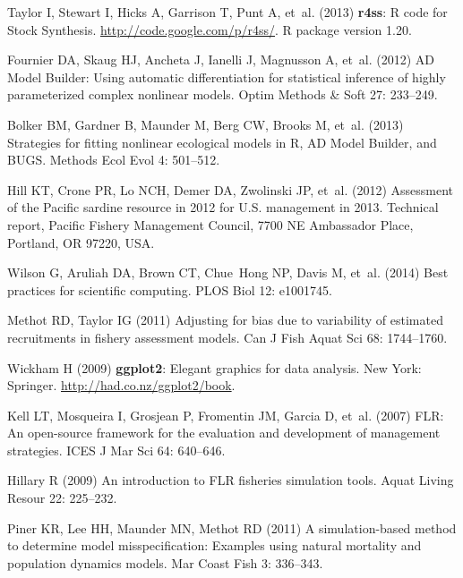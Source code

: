 \begin{thebibliography}{10}
Taylor I, Stewart I, Hicks A, Garrison T, Punt A, et~al. (2013) \textbf{r4ss}:
  \textsf{R} code for Stock Synthesis.
\newblock \urlprefix\url{http://code.google.com/p/r4ss/}.
\newblock \textsf{R} package version 1.20.

Fournier DA, Skaug HJ, Ancheta J, Ianelli J, Magnusson A, et~al. (2012) {AD
  Model Builder}: Using automatic differentiation for statistical inference of
  highly parameterized complex nonlinear models.
\newblock Optim Methods \& Soft 27: 233--249.

Bolker BM, Gardner B, Maunder M, Berg CW, Brooks M, et~al. (2013) Strategies
  for fitting nonlinear ecological models in {R}, {AD Model Builder}, and
  {BUGS}.
\newblock Methods Ecol Evol 4: 501--512.

Hill KT, Crone PR, Lo NCH, Demer DA, Zwolinski JP, et~al. (2012) Assessment of
  the {Pacific} sardine resource in 2012 for {U.S.} management in 2013.
\newblock Technical report, Pacific Fishery Management Council, 7700 NE
  Ambassador Place, Portland, OR 97220, USA.

Wilson G, Aruliah DA, Brown CT, Chue~Hong NP, Davis M, et~al. (2014) Best
  practices for scientific computing.
\newblock PLOS Biol 12: e1001745.

Methot RD, Taylor IG (2011) Adjusting for bias due to variability of estimated
  recruitments in fishery assessment models.
\newblock Can J Fish Aquat Sci 68: 1744--1760.

Wickham H (2009) \textbf{ggplot2}: Elegant graphics for data analysis.
\newblock New York: Springer.
\newblock \urlprefix\url{http://had.co.nz/ggplot2/book}.

Kell LT, Mosqueira I, Grosjean P, Fromentin JM, Garcia D, et~al. (2007) {FLR}:
  An open-source framework for the evaluation and development of management
  strategies.
\newblock ICES J Mar Sci 64: 640--646.

Hillary R (2009) An introduction to {FLR} fisheries simulation tools.
\newblock Aquat Living Resour 22: 225--232.

Piner KR, Lee HH, Maunder MN, Methot RD (2011) A simulation-based method to
  determine model misspecification: Examples using natural mortality and
  population dynamics models.
\newblock Mar Coast Fish 3: 336--343.


\end{thebibliography}
